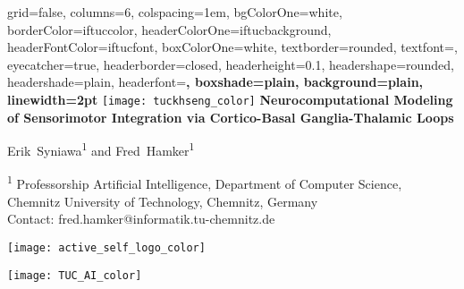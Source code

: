 \documentclass[portrait,final,a0paper,fontscale=0.374]{baposter}
\begin{document}
\begin{poster}%
	{
		grid=false,
		columns=6,
		colspacing=1em,
		bgColorOne=white,
		borderColor=iftuccolor,
		headerColorOne=iftucbackground,
		headerFontColor=iftucfont,
		boxColorOne=white,
		textborder=rounded,
		textfont=\small,
		eyecatcher=true,
		headerborder=closed,
		headerheight=0.1\textheight,
		headershape=rounded,
		headershade=plain,
		headerfont=\Large\bf, %
		boxshade=plain,
		background=plain,
		linewidth=2pt
	}
	{\texttt{[image: tuckhseng\_color]}} 
	{\bf\Large{Neurocomputational Modeling of Sensorimotor Integration via Cortico-Basal Ganglia-Thalamic Loops}\vspace{6pt}}
	{\normalsize Erik~Syniawa\textsuperscript{1} and Fred~Hamker\textsuperscript{1} \\ \vspace{0.8em}
	
	\small\textsuperscript{1} Professorship Artificial Intelligence, Department of Computer Science, \\ Chemnitz University of Technology, Chemnitz, Germany \\ \vspace{0.5em}
	\small Contact: fred.hamker@informatik.tu-chemnitz.de
	}
	{	
		\begin{minipage}[r]{0.1\textwidth}
			\texttt{[image: active\_self\_logo\_color]}
		\end{minipage}
		\hfill
		\begin{minipage}[r]{0.1\textwidth}
			\texttt{[image: TUC\_AI\_color]}
		\end{minipage}
		
	}



\end{poster}
\end{document}
